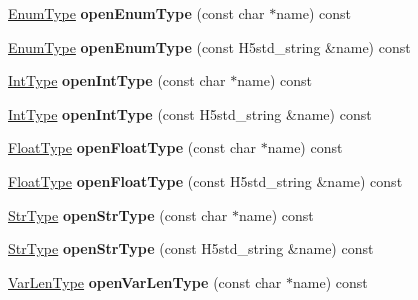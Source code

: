 \begin{DoxyCompactItemize}
\hyperlink{class_h5_1_1_enum_type}{Enum\+Type} {\bfseries open\+Enum\+Type} (const char $\ast$name) const
\item 
\mbox{\label{class_h5_1_1_common_f_g_ac528db25b2903e98201e6de9a1a0743d}} 
\hyperlink{class_h5_1_1_enum_type}{Enum\+Type} {\bfseries open\+Enum\+Type} (const H5std\+\_\+string \&name) const
\item 
\mbox{\label{class_h5_1_1_common_f_g_a8840cb7af2ee07b9957fdfe2e9bb69e6}} 
\hyperlink{class_h5_1_1_int_type}{Int\+Type} {\bfseries open\+Int\+Type} (const char $\ast$name) const
\item 
\mbox{\label{class_h5_1_1_common_f_g_a3b5b0f0cbd4c3c19e1c42ab602c0620c}} 
\hyperlink{class_h5_1_1_int_type}{Int\+Type} {\bfseries open\+Int\+Type} (const H5std\+\_\+string \&name) const
\item 
\mbox{\label{class_h5_1_1_common_f_g_a4ff5671504f7a61a3104a3bdf765a6e4}} 
\hyperlink{class_h5_1_1_float_type}{Float\+Type} {\bfseries open\+Float\+Type} (const char $\ast$name) const
\item 
\mbox{\label{class_h5_1_1_common_f_g_a421f20649d892aaebb9f459ac05f5ef3}} 
\hyperlink{class_h5_1_1_float_type}{Float\+Type} {\bfseries open\+Float\+Type} (const H5std\+\_\+string \&name) const
\item 
\mbox{\label{class_h5_1_1_common_f_g_a399189b9aaaf1de35128c2cdf11dcbb8}} 
\hyperlink{class_h5_1_1_str_type}{Str\+Type} {\bfseries open\+Str\+Type} (const char $\ast$name) const
\item 
\mbox{\label{class_h5_1_1_common_f_g_ac4a7a28353ee69673cbc0746374e271d}} 
\hyperlink{class_h5_1_1_str_type}{Str\+Type} {\bfseries open\+Str\+Type} (const H5std\+\_\+string \&name) const
\item 
\mbox{\label{class_h5_1_1_common_f_g_ac89e5b183b4207da3f997e556ecfd66d}} 
\hyperlink{class_h5_1_1_var_len_type}{Var\+Len\+Type} {\bfseries open\+Var\+Len\+Type} (const char $\ast$name) const
\item 
\mbox{\label{class_h5_1_1_common_f_g_affb3437c69d6249ddb2460d8b1dbc077}} 

\end{DoxyCompactItemize}
